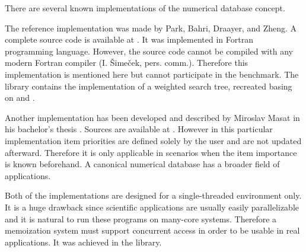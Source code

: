 There are several known implementations of the numerical database concept.

The reference implementation was made by Park, Bahri, Draayer, and Zheng. A complete source code is available at \cite{wstree}. It was implemented in Fortran programming language. However, the source code cannot be compiled with any modern Fortran compiler (I. Šimeček, pers. comm.). Therefore this implementation is mentioned here but cannot participate in the benchmark. The \numdbname library contains the implementation of a weighted search tree, recreated basing on \cite{park90} and \cite{park94}.

Another implementation has been developed and described by Miroslav Masat in his bachelor’s thesis \cite{masat}. Sources are available at \cite{ccherish}. However in this particular implementation item priorities are defined solely by the user and are not updated afterward. Therefore it is only applicable in scenarios when the item importance is known beforehand. A canonical numerical database has a broader field of applications.

Both of the implementations are designed for a single-threaded environment only. It is a huge drawback since scientific applications are usually easily parallelizable and it is natural to run these programs on many-core systems. Therefore a memoization system must support concurrent access in order to be usable in real applications. It was achieved in the \numdbname library.
